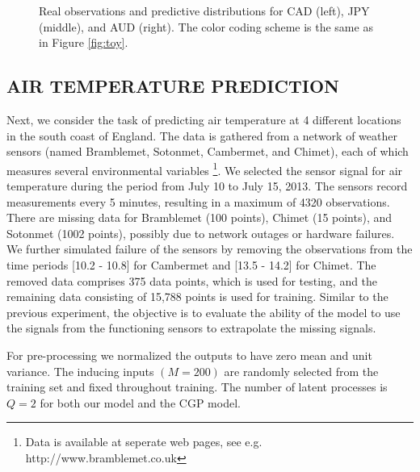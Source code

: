 \begin{figure}
\begin{tabular}{ccc}
\end{tabular}
\caption{Real observations and predictive distributions for CAD (left), JPY (middle), and AUD (right). The color coding scheme is the same as in Figure \ref{fig:toy}.}
\label{fig:fx}
\end{figure}

\subsection{AIR TEMPERATURE PREDICTION}
Next, we consider the task of predicting air temperature at 4 different locations in the south coast of England. 
The data is gathered from a network of weather sensors (named Bramblemet, Sotonmet, Cambermet, and Chimet), each of which measures several environmental variables \citet{osborne2008towards}\footnote{Data is available at seperate web pages, see e.g. http://www.bramblemet.co.uk}.
We selected the sensor signal for air temperature during the period from July 10 to July 15, 2013.
The sensors record measurements every 5 minutes, resulting in a maximum of 4320 observations.
There are missing data for Bramblemet (100 points), Chimet (15 points), and Sotonmet (1002 points), possibly due to network outages or hardware failures.
We further simulated failure of the sensors by removing the observations from the time periods [10.2 - 10.8] for Cambermet and [13.5 - 14.2] for Chimet.
The removed data comprises 375 data points, which is used for testing, and the remaining data consisting of 15,788 points is used for training.
Similar to the previous experiment, the objective is to evaluate the ability of the model to use the signals from the functioning sensors to extrapolate the missing signals.

For pre-processing we normalized the outputs to have zero mean and unit variance.
The inducing inputs $(M = 200)$ are randomly selected from the training set and fixed throughout training.
The number of latent processes is $Q = 2$ for both our model and the CGP model.

